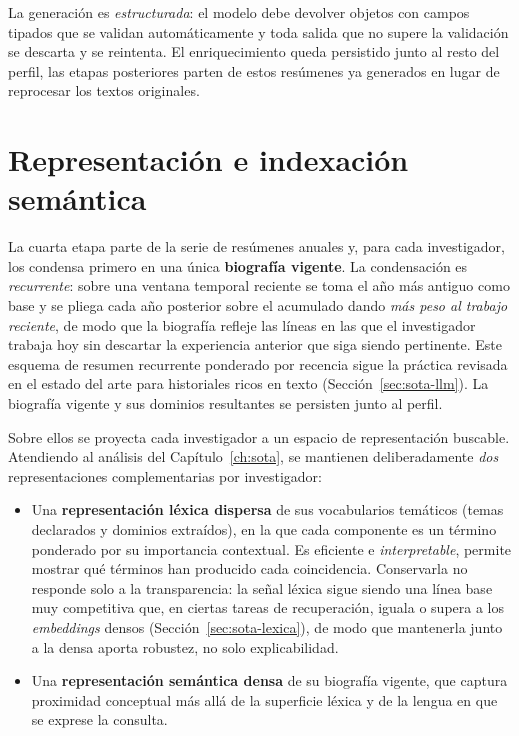 La generación es \emph{estructurada}: el modelo debe devolver objetos con campos tipados que se validan automáticamente y toda salida que no supere la validación se descarta y se reintenta.
El enriquecimiento queda persistido junto al resto del perfil, las etapas posteriores parten de estos resúmenes ya generados en lugar de reprocesar los textos originales.

\section{Representación e indexación semántica}
\label{sec:met-indexacion}

La cuarta etapa parte de la serie de resúmenes anuales y, para cada investigador, los condensa primero en una única \textbf{biografía vigente}.
La condensación es \emph{recurrente}: sobre una ventana temporal reciente se toma el año más antiguo como base y se pliega cada año posterior sobre el acumulado dando \emph{más peso al trabajo reciente}, de modo que la biografía refleje las líneas en las que el investigador trabaja hoy sin descartar la experiencia anterior que siga siendo pertinente.
Este esquema de resumen recurrente ponderado por recencia sigue la práctica revisada en el estado del arte para historiales ricos en texto (Sección~\ref{sec:sota-llm}).
La biografía vigente y sus dominios resultantes se persisten junto al perfil.

Sobre ellos se proyecta cada investigador a un espacio de representación buscable.
Atendiendo al análisis del Capítulo~\ref{ch:sota}, se mantienen deliberadamente \emph{dos} representaciones complementarias por investigador:

\begin{itemize}
    \item Una \textbf{representación léxica dispersa} de sus vocabularios temáticos (temas declarados y dominios extraídos), en la que cada componente es un término ponderado por su importancia contextual.
    Es eficiente e \emph{interpretable}, permite mostrar qué términos han producido cada coincidencia.
    Conservarla no responde solo a la transparencia: la señal léxica sigue siendo una línea base muy competitiva que, en ciertas tareas de recuperación, iguala o supera a los \emph{embeddings} densos (Sección~\ref{sec:sota-lexica}), de modo que mantenerla junto a la densa aporta robustez, no solo explicabilidad.
    \item Una \textbf{representación semántica densa} de su biografía vigente, que captura proximidad conceptual más allá de la superficie léxica y de la lengua en que se exprese la consulta.
\end{itemize}


